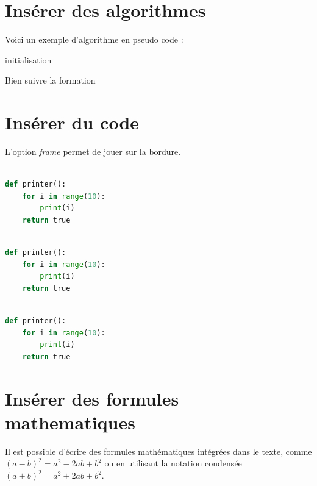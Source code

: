\documentclass[10pt,a4paper]{report} %
\begin{document}
\section{Insérer des algorithmes}
Voici un exemple d'algorithme en pseudo code : 

\begin{algorithm}[H]
	\SetAlgoLined
	initialisation\;
	\caption{Bien suivre la formation}
\end{algorithm}
\section{Insérer du code}
L'option \emph{frame} permet de jouer sur la bordure.
\begin{lstlisting}[language=Python, frame=L, caption={Une imprimante des premiers nombres},label=monImprimante]  % Start your code-block

def printer():
	for i in range(10):
		print(i)
	return true
\end{lstlisting}

\begin{lstlisting}[language=Python, frame=single, caption={Une seconde imprimante des premiers nombres},label=monImprimante2]  % Start your code-block

def printer():
	for i in range(10):
		print(i)
	return true
\end{lstlisting}

\begin{lstlisting}[language=Python, frame=shadowbox, caption={Une troisième imprimante des premiers nombres},label=monImprimante3]  % Start your code-block

def printer():
	for i in range(10):
		print(i)
	return true
\end{lstlisting}


\section{Insérer des formules mathematiques}
Il est possible d'écrire des formules mathématiques intégrées dans le texte, comme \begin{math}(a-b)^2=a^2-2ab+b^2\end{math} ou en utilisant la notation condensée $(a+b)^2=a^2+2ab+b^2$.
\end{document}
